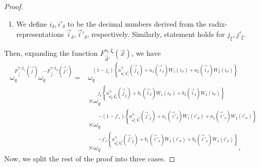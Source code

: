 \documentclass[pdflatex,sn-mathphys-num]{sn-jnl}%
\theoremstyle{thmstyleone}
\begin{document}
\begin{proof}
\begin{enumerate}
			\item We define $i_{\delta}, i'_{\delta}$ to be the decimal numbers derived from the radix-representations $\vec{i}_{\delta}, \vec{i}'_{\delta}$, respectively. Similarly, statement holds for $j_{\xi}, j'_{\xi}$.
		\end{enumerate}
		Then, expanding the function $ F_{ \vec{d}'}^{\bm{\gamma}, \bm{\zeta}} (\vec{x})$, we have
		\begin{equation}\label{Thm_4_omega_eqn_1}
			\begin{split}
				\omega_q^{ F_{ \vec{i}}^{\bm{\gamma}, \bm{\zeta}_1} (\vec{j}) } \omega_q^{ -F_{ \vec{i}'}^{\bm{\gamma}, \bm{\zeta}_2} (\vec{j}') }
				=& \omega_q^{ (1-j_{\epsilon}) \left\{a_{\mathbf{s}_1^1,\mathbf{t}_1^1}^{\bm{\gamma}} (\vec{j}_{\xi}) + a_1(\vec{i}_{\delta}) W_1(i_\vartheta) + a_2(\vec{i}_{\delta}) W_2(i_\vartheta) \right\}} \\
				&  \times \omega_q^{ j_{\epsilon} \left\{a_{\mathbf{s}_2^1,\mathbf{t}_2^1}^{\bm{\gamma}} (\vec{j}_{\xi}) + b_1(\vec{i}_{\delta}) W_1(i_\vartheta) + b_2(\vec{i}_{\delta}) W_2(i_\vartheta)\right\}} \\
				& \times \omega_q^{ -(1-j'_{\epsilon}) \left\{a_{\mathbf{s}_1^2,\mathbf{t}_1^2}^{\bm{\gamma}} (\vec{j}'_{\xi}) + a_1(\vec{i}'_{\delta}) W_1(i'_\vartheta) + a_2(\vec{i}'_{\delta}) W_2(i'_\vartheta)\right\}} \\
				& \times \omega_q^{ -j'_{\epsilon} \left\{a_{\mathbf{s}_2^2,\mathbf{t}_2^2}^{\bm{\gamma}} (\vec{j}'_{\xi}) + b_1(\vec{i}'_{\delta}) W_1(i'_\vartheta) + b_2(\vec{i}'_{\delta}) W_2(i'_\vartheta)\right\}},
			\end{split}
		\end{equation}
		Now, we split the rest of the proof into three cases.
		

\end{proof}
\end{document}
